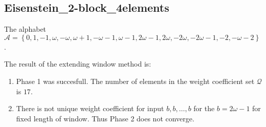 \subsection{ Eisenstein\_2-block\_4elements }

\label{subsec:Eisenstein2-block4elements}

The alphabet $\mathcal{A} =\left\{0, 1, -1, \omega, -\omega, \omega + 1, -\omega - 1, \omega - 1, 2\omega - 1, 2\omega, -2\omega, -2\omega - 1, -2, -\omega - 2\right\}$.

\noindent The result of the extending window method is:
\begin{enumerate}
    \item Phase 1 was succesfull.
The number of elements in the weight coefficient set $\mathcal{Q}$ is $17$.

    \item There is not unique weight coefficient for input $b,b,\dots,b$ for the $b= 2\omega - 1 $ for fixed length of window. Thus Phase 2 does not converge.

\end{enumerate}
